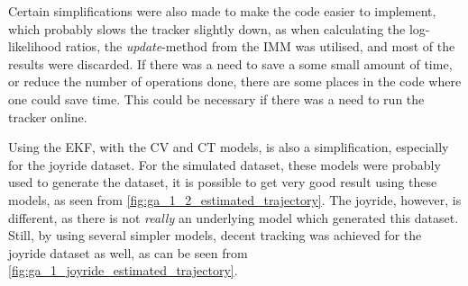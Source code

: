 Certain simplifications were also made to make the code easier to implement, which probably slows the tracker slightly down, as when calculating the log-likelihood ratios, the \textit{update}-method from the IMM was utilised, and most of the results were discarded. If there was a need to save a some small amount of time, or reduce the number of operations done, there are some places in the code where one could save time. This could be necessary if there was a need to run the tracker online. 

Using the EKF, with the CV and CT models, is also a simplification, especially for the joyride dataset. For the simulated dataset, these models were probably used to generate the dataset, it is possible to get very good result using these models, as seen from \cref{fig:ga_1_2_estimated_trajectory}. The joyride, however, is different, as there is not \textit{really} an underlying model which generated this dataset. Still, by using several simpler models, decent tracking was achieved for the joyride dataset as well, as can be seen from \cref{fig:ga_1_joyride_estimated_trajectory}. 






